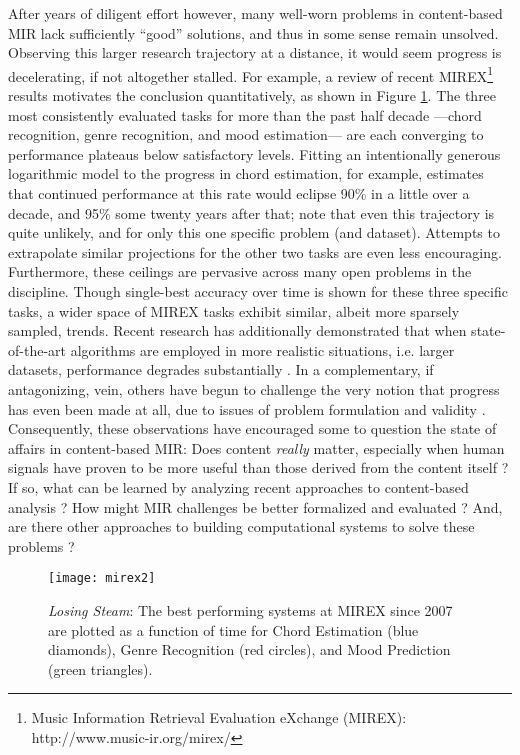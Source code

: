 After years of diligent effort however, many well-worn problems in content-based MIR lack sufficiently ``good'' solutions, and thus in some sense remain unsolved.
Observing this larger research trajectory at a distance, it would seem progress is decelerating, if not altogether stalled.
For example, a review of recent MIREX\footnote{Music Information Retrieval Evaluation eXchange (MIREX): {http://www.music-ir.org/mirex/}} results motivates the conclusion quantitatively, as shown in Figure \ref{fig:mirex}.
The three most consistently evaluated tasks for more than the past half decade ---chord recognition, genre recognition, and mood estimation--- are each converging to performance plateaus below satisfactory levels.
Fitting an intentionally generous logarithmic model to the progress in chord estimation, for example, estimates that continued performance at this rate would eclipse 90\% in a little over a decade, and 95\% some twenty years after that; note that even this trajectory is quite unlikely, and for only this one specific problem (and dataset).
Attempts to extrapolate similar projections for the other two tasks are even less encouraging.
Furthermore, these ceilings are pervasive across many open problems in the discipline.
Though single-best accuracy over time is shown for these three specific tasks, a wider space of MIREX tasks exhibit similar, albeit more sparsely sampled, trends.
Recent research has additionally demonstrated that when state-of-the-art algorithms are employed in more realistic situations, i.e. larger datasets, performance degrades substantially \cite{BertinMahieux2012}.
In a complementary, if antagonizing, vein, others have begun to challenge the very notion that progress has even been made at all, due to issues of problem formulation and validity \cite{Sturm2013}.
Consequently, these observations have encouraged some to question the state of affairs in content-based MIR:
Does content \emph{really} matter, especially when human signals have proven to be more useful than those derived from the content itself \cite{Slaney2011}?
If so, what can be learned by analyzing recent approaches to content-based analysis \cite{Flexer2012}?
How might MIR challenges be better formalized and evaluated \cite{Sturm2014}?
And, are there other approaches to building computational systems to solve these problems \cite{Humphrey2012a}?

\begin{figure}
\begin{centering}
\texttt{[image: mirex2]}
\caption{\emph{Losing Steam}: The best performing systems at MIREX since 2007 are plotted as a function of time for Chord Estimation (blue diamonds), Genre Recognition (red circles), and Mood Prediction (green triangles).}
\label{fig:mirex}
\end{centering}
\end{figure}

